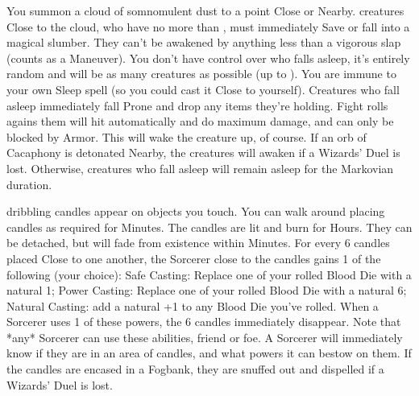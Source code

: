 {You summon a cloud of somnomulent dust to a point Close or Nearby. 
\SUMDICE creatures Close to the cloud, who have no more than \DICE \HD, must
immediately Save or fall into a magical slumber.   They can't be awakened by
anything less than a vigorous slap (counts as a Maneuver).  You don't have
control over who falls asleep, it's entirely random and will be as many
creatures as possible (up to \SUMDICE).  You are immune to your own Sleep
spell (so you could cast it Close to yourself).  Creatures who fall asleep
immediately fall Prone and drop any items they're holding.  Fight rolls
agains them will hit automatically and do maximum damage, and can only be
blocked by Armor.  This will wake the creature up, of course.  If an orb of
Cacaphony is detonated Nearby, the creatures will awaken if a Wizards' Duel
is lost.  Otherwise, creatures who fall asleep will remain asleep for the
Markovian duration.   




\SPELL[
  Name=Summon Candles,
  Link=wizardry-summon-candles,
  Paradigm=Force,
  Save=N,
  Duration=Varies,
  Counter=\mylink{Fogbank}{wizardry-fogbank} ,
  Keywords=None,
  Target=Close
]



\SUMDICE dribbling candles appear on objects you touch. You can walk around
placing candles as required for Minutes. The candles are lit and burn for
Hours. They can be detached, but will fade from existence within Minutes. 
For every 6 candles placed Close to one another, the Sorcerer close to the
candles gains 1 of the following (your choice): Safe Casting: Replace one of
your rolled Blood Die with a natural 1; Power Casting: Replace one of your
rolled Blood Die with a natural 6; Natural Casting: add a natural +1 to any
Blood Die you've rolled.  When a Sorcerer uses 1 of these powers, the 6
candles immediately disappear.  Note that *any* Sorcerer can use these
abilities, friend or foe.  A Sorcerer will immediately know if they are in
an area of candles, and what powers it can bestow on them.  If the candles
are encased in a Fogbank, they are snuffed out and dispelled if a Wizards'
Duel is lost.





\SPELL[
  Name=Suspend Objects,
  Link=wizardry-suspend-objects,
  Paradigm=Force,
  Save=Y (negate),
  Duration=Concentration,
  Counter=\mylink{Levitating Disc}{wizardry-levitating-disc} ,
  Keywords=None,
  Target=Any Distance
]



}
